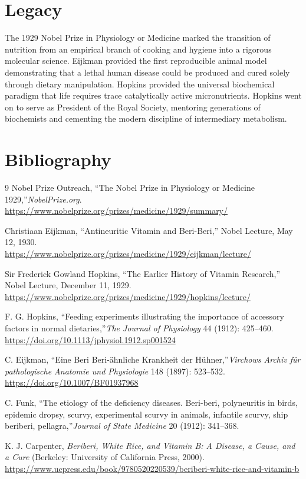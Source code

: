 \section{Legacy}

The 1929 Nobel Prize in Physiology or Medicine marked the transition of nutrition from an empirical branch of cooking and hygiene into a rigorous molecular science. Eijkman provided the first reproducible animal model demonstrating that a lethal human disease could be produced and cured solely through dietary manipulation. Hopkins provided the universal biochemical paradigm that life requires trace catalytically active micronutrients. Hopkins went on to serve as President of the Royal Society, mentoring generations of biochemists and cementing the modern discipline of intermediary metabolism.

\section{Bibliography}

\begin{thebibliography}{9}
Nobel Prize Outreach, ``The Nobel Prize in Physiology or Medicine 1929,''\emph{NobelPrize.org}.\\
\url{https://www.nobelprize.org/prizes/medicine/1929/summary/}

Christiaan Eijkman, ``Antineuritic Vitamin and Beri-Beri,'' Nobel Lecture, May 12, 1930.\\
\url{https://www.nobelprize.org/prizes/medicine/1929/eijkman/lecture/}

Sir Frederick Gowland Hopkins, ``The Earlier History of Vitamin Research,'' Nobel Lecture, December 11, 1929.\\
\url{https://www.nobelprize.org/prizes/medicine/1929/hopkins/lecture/}

F. G. Hopkins, ``Feeding experiments illustrating the importance of accessory factors in normal dietaries,''\emph{The Journal of Physiology} 44 (1912): 425--460.\\
\url{https://doi.org/10.1113/jphysiol.1912.sp001524}

C. Eijkman, ``Eine Beri Beri-ähnliche Krankheit der Hühner,''\emph{Virchows Archiv für pathologische Anatomie und Physiologie} 148 (1897): 523--532.\\
\url{https://doi.org/10.1007/BF01937968}

C. Funk, ``The etiology of the deficiency diseases. Beri-beri, polyneuritis in birds, epidemic dropsy, scurvy, experimental scurvy in animals, infantile scurvy, ship beriberi, pellagra,''\emph{Journal of State Medicine} 20 (1912): 341--368.

K. J. Carpenter, \emph{Beriberi, White Rice, and Vitamin B: A Disease, a Cause, and a Cure} (Berkeley: University of California Press, 2000).\\
\url{https://www.ucpress.edu/book/9780520220539/beriberi-white-rice-and-vitamin-b}
\end{thebibliography}
